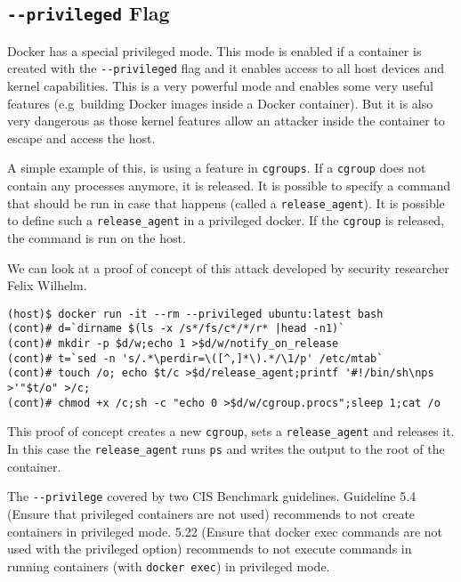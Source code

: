 \subsection{\texorpdfstring{\lstinline{--privileged}}{--privileged} Flag}

Docker has a special privileged mode\cite{Docker-in-Docker-blog}. This mode is enabled if a container is created with the \lstinline{--privileged} flag and it enables access to all host devices and kernel capabilities. This is a very powerful mode and enables some very useful features (e.g\ building Docker images inside a Docker container). But it is also very dangerous as those kernel features allow an attacker inside the container to escape and access the host.

\hfill

A simple example of this, is using a feature in \lstinline{cgroups}\cite{CGroup-Docs}. If a \lstinline{cgroup} does not contain any processes anymore, it is released. It is possible to specify a command that should be run in case that happens (called a \lstinline{release_agent}). It is possible to define such a \lstinline{release_agent} in a privileged docker. If the \lstinline{cgroup} is released, the command is run on the host\cite{TrailOfBits-Docker-Escape}.

\hfill

We can look at a proof of concept of this attack developed by security researcher Felix Wilhelm\cite{Felix-Wilhem-Tweet}.
\begin{lstlisting}[caption={Docker escape using \lstinline{cgroups} (privileged)},captionpos=b]
(host)$ docker run -it --rm --privileged ubuntu:latest bash
(cont)# d=`dirname $(ls -x /s*/fs/c*/*/r* |head -n1)`
(cont)# mkdir -p $d/w;echo 1 >$d/w/notify_on_release
(cont)# t=`sed -n 's/.*\perdir=\([^,]*\).*/\1/p' /etc/mtab`
(cont)# touch /o; echo $t/c >$d/release_agent;printf '#!/bin/sh\nps >'"$t/o" >/c;
(cont)# chmod +x /c;sh -c "echo 0 >$d/w/cgroup.procs";sleep 1;cat /o
\end{lstlisting}

This proof of concept creates a new \lstinline{cgroup}, sets a \lstinline{release_agent} and releases it. In this case the \lstinline{release_agent} runs \lstinline{ps} and writes the output to the root of the container.

\hfill

The \lstinline{--privilege} covered by two CIS Benchmark guidelines. Guideline 5.4 (Ensure that privileged containers are not used) recommends to not create containers in privileged mode. 5.22 (Ensure that docker exec commands are not used with the privileged option) recommends to not execute commands in running containers (with \lstinline{docker exec}) in privileged mode.

